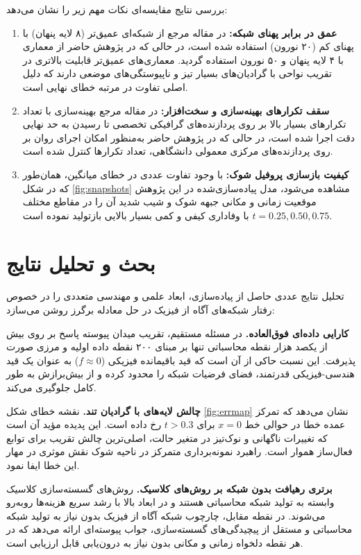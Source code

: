 بررسی نتایج مقایسه‌ای نکات مهم زیر را نشان می‌دهد:
\begin{enumerate}
\item \textbf{عمق در برابر پهنای شبکه:} در مقاله مرجع از شبکه‌ای عمیق‌تر (۸ لایه پنهان) با پهنای کم (۲۰ نورون) استفاده شده است، در حالی که در پژوهش حاضر از معماری با ۴ لایه پنهان و ۵۰ نورون استفاده گردید. معماری‌های عمیق‌تر قابلیت بالاتری در تقریب نواحی با گرادیان‌های بسیار تیز و ناپیوستگی‌های موضعی دارند که دلیل اصلی تفاوت در مرتبه خطای نهایی است.
\item \textbf{سقف تکرارهای بهینه‌سازی و سخت‌افزار:} در مقاله مرجع بهینه‌سازی  با تعداد تکرارهای بسیار بالا بر روی پردازنده‌های گرافیکی تخصصی تا رسیدن به حد نهایی دقت اجرا شده است، در حالی که در پژوهش حاضر به‌منظور امکان اجرای روان بر روی پردازنده‌های مرکزی معمولی دانشگاهی، تعداد تکرارها کنترل شده است.
\item \textbf{کیفیت بازسازی پروفیل شوک:} با وجود تفاوت عددی در خطای میانگین، همان‌طور که در شکل \ref{fig:snapshots} مشاهده می‌شود، مدل پیاده‌سازی‌شده در این پژوهش موقعیت زمانی و مکانی جبهه شوک و شیب شدید آن را در مقاطع مختلف $t=0.25, 0.50, 0.75$ با وفاداری کیفی و کمی بسیار بالایی بازتولید نموده است.
\end{enumerate}

\section{بحث و تحلیل نتایج}
\label{sec:discussion}

تحلیل نتایج عددی حاصل از پیاده‌سازی، ابعاد علمی و مهندسی متعددی را در خصوص رفتار شبکه‌های آگاه از فیزیک در حل معادله برگرز روشن می‌سازد:

\textbf{کارایی داده‌ای فوق‌العاده.} در مسئله مستقیم، تقریب میدان پیوسته پاسخ بر روی بیش از یکصد هزار نقطه محاسباتی تنها بر مبنای ۲۰۰ نقطه داده اولیه و مرزی صورت پذیرفت. این نسبت حاکی از آن است که قید باقیمانده فیزیکی ($f \approx 0$) به عنوان یک قید هندسی-فیزیکی قدرتمند، فضای فرضیات شبکه را محدود کرده و از بیش‌برازش به طور کامل جلوگیری می‌کند.

\textbf{چالش لایه‌های با گرادیان تند.} نقشه خطای شکل \ref{fig:errmap} نشان می‌دهد که تمرکز عمده خطا در حوالی خط $x=0$ برای $t > 0.3$ رخ داده است. این پدیده مؤید آن است که تغییرات ناگهانی و نوک‌تیز در متغیر حالت، اصلی‌ترین چالش تقریب برای توابع فعال‌ساز هموار است. راهبرد نمونه‌برداری متمرکز در ناحیه شوک نقش موثری در مهار این خطا ایفا نمود.

\textbf{برتری رهیافت بدون شبکه بر روش‌های کلاسیک.} روش‌های گسسته‌سازی کلاسیک وابسته به تولید شبکه محاسباتی هستند و در ابعاد بالا با رشد سریع هزینه‌ها روبه‌رو می‌شوند. در نقطه مقابل، چارچوب شبکه آگاه از فیزیک بدون نیاز به تولید شبکه محاسباتی و مستقل از پیچیدگی‌های گسسته‌سازی، جواب پیوسته‌ای ارائه می‌دهد که در هر نقطه دلخواه زمانی و مکانی بدون نیاز به درون‌یابی قابل ارزیابی است.

